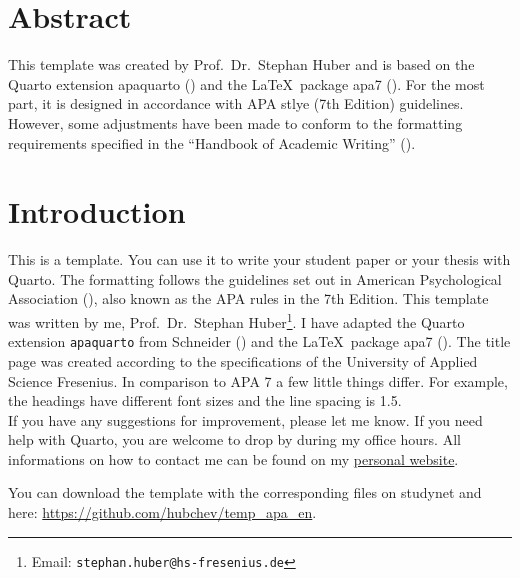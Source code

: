 \documentclass[
  stu,
  floatsintext,
  longtable,
  a4paper,
  nolmodern,
  notxfonts,
  notimes,
  colorlinks=true,linkcolor=black,citecolor=black,urlcolor=black]{apa7}
\begin{document}
\setcounter{secnumdepth}{5}

\setlength\LTleft{0pt}


\section*{Abstract}\label{abstract}

\noindent  This template was created by Prof.~Dr.~Stephan Huber and is
based on the Quarto extension apaquarto
() and the
\LaTeX~package apa7 ().
For the most part, it is designed in accordance with APA stlye (7th
Edition) guidelines. However, some adjustments have been made to conform
to the formatting requirements specified in the ``Handbook of Academic
Writing'' ().

\newpage
\thispagestyle{empty}
\tableofcontents
\clearpage
\listoffigures
\clearpage
\listoftables

\newpage

\section{Introduction}\label{introduction}

This is a template. You can use it to write your student paper or your
thesis with Quarto. The formatting follows the guidelines set out in
American Psychological Association
(), also known as the APA rules
in the 7th Edition. This template was written by me, Prof.~Dr.~Stephan
Huber\footnote{Email: \texttt{stephan.huber@hs-fresenius.de}}. I have
adapted the Quarto extension \texttt{apaquarto} from Schneider
() and the \LaTeX~package apa7
(). The title page was
created according to the specifications of the University of Applied
Science Fresenius. In comparison to APA 7 a few little things differ.
For example, the headings have different font sizes and the line spacing
is 1.5.\\
If you have any suggestions for improvement, please let me know. If you
need help with Quarto, you are welcome to drop by during my office
hours. All informations on how to contact me can be found on my
\href{https://hubchev.github.io/}{personal website}.

You can download the template with the corresponding files on studynet
and here: \url{https://github.com/hubchev/temp_apa_en}.
\end{document}
